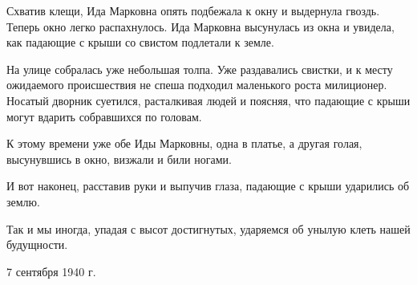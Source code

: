 \documentclass[12pt]{extarticle}
\begin{document}
Схватив клещи, Ида Марковна опять подбежала 
к окну и выдернула гвоздь.  Теперь окно
легко распахнулось.  Ида Марковна высунулась
из окна и увидела, как падающие  с  крыши со
свистом подлетали к земле.
    
На улице  собралась уже небольшая толпа.
Уже  раздавались  свистки, и к месту ожидаемого 
происшествия  не спеша подходил маленького 
роста  милиционер. Носатый дворник суетился, 
расталкивая людей и поясняя,  что падающие 
с крыши могут вдарить собравшихся  по
головам.
    
К  этому времени  уже обе  Иды Марковны,
одна  в платье, а другая голая,  высунувшись
в окно, визжали и били ногами.
   
И вот наконец,  расставив руки и выпучив
глаза, падающие с крыши ударились об землю.

Так и  мы иногда, упадая с высот достигнутых, 
ударяемся об унылую клеть нашей будущности.

\begin{flushright}
7 сентября 1940 г.
\end{flushright}
\end{document}
